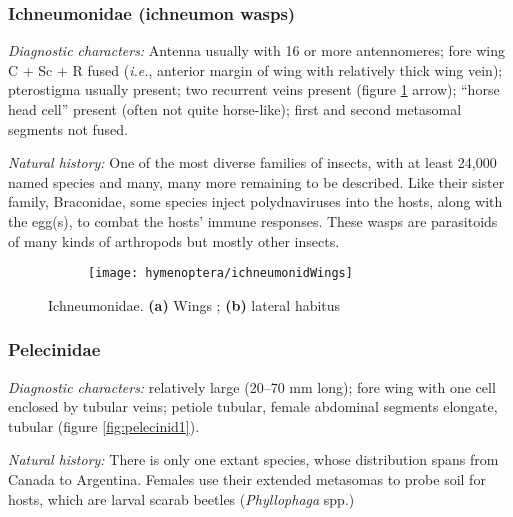 \subsubsection{Ichneumonidae (ichneumon wasps)}
\noindent{}\textit{Diagnostic characters:} Antenna usually with 16 or more antennomeres; fore wing C + Sc + R fused (\textit{i.e.}, anterior margin of wing with relatively thick wing vein); pterostigma usually present; two recurrent veins present (figure \ref{fig:ichneumonid1} arrow); ``horse head cell'' present (often not quite horse-like); first and second metasomal segments not fused.\vspace{3mm}

\noindent{}\textit{Natural history:} One of the most diverse families of insects, with at least 24,000 named species and many, many more remaining to be described. Like their sister family, Braconidae, some species inject polydnaviruses into the hosts, along with the egg(s), to combat the hosts' immune responses. These wasps are parasitoids of many kinds of arthropods but mostly other insects.

\begin{figure}[ht!]
    \centering
    \begin{subfigure}[ht!]{0.45\textwidth}
        \texttt{[image: hymenoptera/ichneumonidWings]}
        \caption{}
        \label{fig:ichneumonid1}
    \end{subfigure}
    \hfill
    \begin{subfigure}[ht!]{0.4\textwidth}
        \caption{}
        \label{fig:ichneumonid2}
    \end{subfigure}
    \caption{Ichneumonidae. \textbf{(a)} Wings \citep[redrawn from][Fig. 55]{comstock1918wings}; \textbf{(b)} lateral habitus \citep[][Fig. 159]{goulet1993hymenoptera}}\label{fig:ichneumonids}
\end{figure}

\subsubsection{Pelecinidae}
\noindent{}\textit{Diagnostic characters:} relatively large (20--70 mm long); fore wing with one cell enclosed by tubular veins; petiole tubular, female abdominal segments elongate, tubular (figure \ref{fig:pelecinid1}).\vspace{3mm}

\noindent{}\textit{Natural history:} There is only one extant species, whose distribution spans from Canada to Argentina. Females use their extended metasomas to probe soil for hosts, which are larval scarab beetles (\textit{Phyllophaga} spp.)

